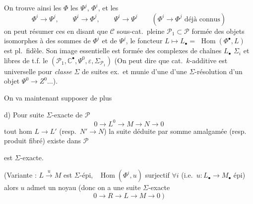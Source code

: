 \documentclass[11pt,a4paper]{article}
\begin{document}
On trouve ainsi  les \struck{\ill{} (\ill{}}  $\Phi$ \ill{} les
$\Psi^j$, $\Phi^i$, et les \struck{\ill{}}
\[
\Phi^i \to \Psi^j, \qquad \Psi^i \to \Phi^j, \qquad \Psi^i \to \Psi^j \qquad (\Phi^i \to \Phi^j \text{ déjà connus})
\]
on peut résumer ces  en disant que  $\mathcal{C}$  sous-cat.\ pleine
$\mathcal{P}_1 \subset \mathcal{P}$ formée des objets isomorphes à des sommes
de $\Phi^i$ et de $\Psi^j$, le foncteur $L \mapsto L_{\bullet} =$
$\operatorname{Hom}(\Phi^{\bullet}, L)$ est pl.\ fidèle. Son image essentielle
est formée des complexes de chaînes $L_{\bullet}$ \struck{\ill{}}  $\Sigma_i$ et
   libres de t.f.
\struck{\ill{}}  \ill{}  \ill{} le \struck{\ill{}}
$(\mathcal{P}_1, \mathbb{C}^{\bullet}, \Psi^0, \varepsilon, \Sigma_{\mathcal{P}_1})$
(On peut dire que \ill{} \ill{} cat.\ $k$-additive
est universelle pour \emph{classe} $\Sigma$ de suites ex.\ et
munie d'une \ill{} \ill{}
d'une $\Sigma$-résolution d'un objet $\Psi^0 \to Z^0 \ldots$).

On va maintenant supposer de plus

d) Pour  suite $\Sigma$-exacte de $\mathcal{P}$
\[
0 \to L^0 \to M \to N \to 0
\]
 tout hom $L \to L'$ (resp.\ $N' \to N$)
la suite \struck{\ill{}} déduite par somme amalgamée (resp.\  produit fibré) existe dans $\mathcal{P}$

 est $\Sigma$-exacte.

(Variante :  $L \xrightarrow{\ u\ } M$ est \struck{\ill{}}  $\Sigma$-épi,
 \ $\operatorname{Hom}(\Phi^i, u)$ surjectif
 $\forall i$ (i.e.\ $u : L_{\bullet} \to M_{\bullet}$ épi) alors $u$
\struck{\ill{}} admet un noyau (donc on a une suite $\Sigma$-exacte
\[
0 \to R \to L \to M \to 0\ )
\]
\end{document}
